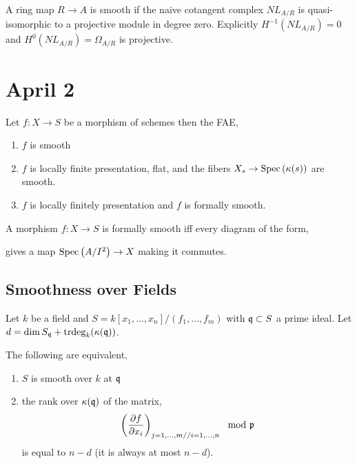 \documentclass[12pt]{article}
\begin{document}
\begin{prop}
A ring map $R \to A$ is smooth if the naive cotangent complex $NL_{A/R}$ is quasi-isomorphic to a projective module in degree zero. Explicitly $H^{-1}(NL_{A/R}) = 0$ and $H^0(NL_{A/R}) = \Omega_{A/R}$ is projective.
\end{prop}

\section{April 2}

\begin{theorem}
Let $f : X \to S$ be a morphism of schemes then the FAE,
\begin{enumerate}
\item $f$ is smooth
\item $f$ is locally finite presentation, flat, and the fibers $X_s \to \mathrm{Spec}\left( \kappa(s) \right)$ are smooth.
\item $f$ is locally finitely presentation and $f$ is formally smooth. 
\end{enumerate}
\end{theorem}

\begin{defn}
A morphism $f : X \to S$ is formally smooth iff every diagram of the form,
\begin{center}
\end{center}
gives a map $\mathrm{Spec}\left( A/I^2 \right) \to X$ making it commutes.
\end{defn}

\subsection{Smoothness over Fields}

Let $k$ be a field and $S = k[x_1, \dots, x_n]/(f_1, \dots, f_m)$ with $\mathfrak{q} \subset S$ a prime ideal. Let $d = \dim{S_{\mathfrak{q}}} + \mathrm{trdeg}_{k}(\kappa(\mathfrak{q}))$.

\begin{prop}
The following are equivalent,
\begin{enumerate}
\item $S$ is smooth over $k$ at $\mathfrak{q}$ 
\item the rank over $\kappa(\mathfrak{q})$ of the matrix,
\[ \left( \frac{\partial{f}}{\partial{x_i}} \right)_{\substack{j = 1, \dots, m // i = 1, \dots , n}} \mod {\mathfrak{p}} \]
is equal to $n - d$ (it is always at most $n - d$).
\end{enumerate}
\end{prop} 
\end{document}
